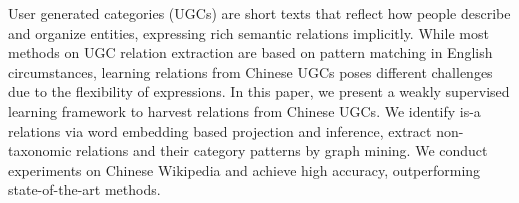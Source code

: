 User generated categories (UGCs) are short texts that reflect how people describe and organize entities, expressing rich semantic relations implicitly. While most methods on UGC relation extraction are based on pattern matching in English circumstances, learning relations from Chinese UGCs poses different challenges due to the flexibility of expressions. In this paper, we present a weakly supervised learning framework to harvest relations from Chinese UGCs. We identify is-a relations via word embedding based projection and inference, extract non-taxonomic relations and their category patterns by graph mining. We conduct experiments on Chinese Wikipedia and achieve high accuracy, outperforming state-of-the-art methods.
